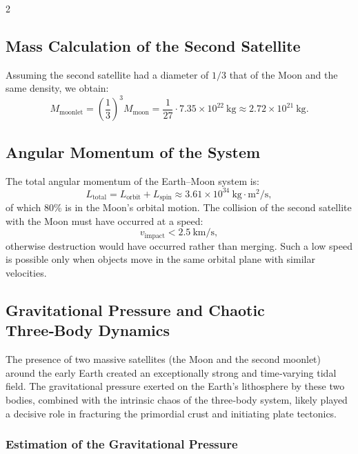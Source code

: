 \documentclass[11pt,a4paper]{article}
\begin{document}
\begin{multicols}{2}
		\subsection{Mass Calculation of the Second Satellite}
		
		Assuming the second satellite had a diameter of \(1/3\) that of the Moon and the same density, we obtain:
		{\small
			\[
			M_{\text{moonlet}} = \left(\frac{1}{3}\right)^3 M_{\text{moon}} = \frac{1}{27} \cdot 7.35 \times 10^{22}\ \text{kg} \approx 2.72 \times 10^{21}\ \text{kg}.
			\]}
		
		\subsection{Angular Momentum of the System}
		
		The total angular momentum of the Earth–Moon system is:
		\[
		L_{\text{total}} = L_{\text{orbit}} + L_{\text{spin}} \approx 3.61 \times 10^{34}\ \text{kg}\cdot\text{m}^2/\text{s},
		\]
		of which 80\% is in the Moon's orbital motion. The collision of the second satellite with the Moon must have occurred at a speed:
		\[
		v_{\text{impact}} < 2.5\ \text{km/s},
		\]
		otherwise destruction would have occurred rather than merging. Such a low speed is possible only when objects move in the same orbital plane with similar velocities.
		
		\subsection{Gravitational Pressure and Chaotic Three‑Body Dynamics}
		
		The presence of two massive satellites (the Moon and the second moonlet) around the early Earth created an exceptionally strong and time‑varying tidal field.  The gravitational pressure exerted on the Earth’s lithosphere by these two bodies, combined with the intrinsic chaos of the three‑body system, likely played a decisive role in fracturing the primordial crust and initiating plate tectonics.
		
		\subsubsection{Estimation of the Gravitational Pressure}
		

\end{multicols}
\end{document}
